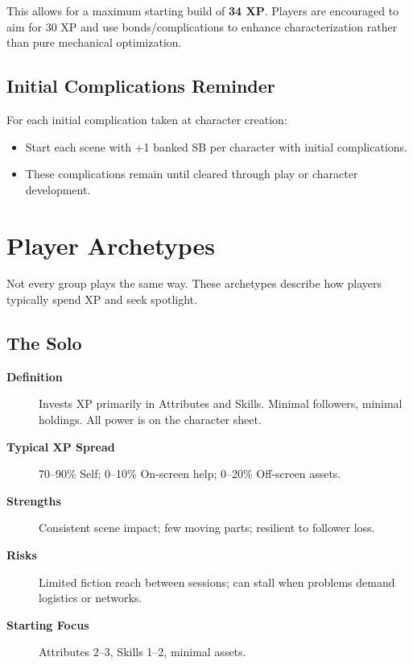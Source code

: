 This allows for a maximum starting build of \textbf{34 XP}. Players are encouraged to aim for 30 XP and use bonds/complications to enhance characterization rather than pure mechanical optimization. 

\subsection{Initial Complications Reminder}
\label{subsec:initial-complications}

For each initial complication taken at character creation:
\begin{itemize}
\item Start each scene with +1 banked SB per character with initial complications.
\item These complications remain until cleared through play or character development.
\end{itemize}

\section{Player Archetypes}
\label{sec:player-archetypes}

Not every group plays the same way. These archetypes describe how players typically spend XP and seek spotlight.

\subsection{The Solo}
\label{subsec:solo-archetype}

\begin{description}
\item[\textbf{Definition}] Invests XP primarily in Attributes and Skills. Minimal followers, minimal holdings. All power is on the character sheet.
\item[\textbf{Typical XP Spread}] 70--90\% Self; 0--10\% On-screen help; 0--20\% Off-screen assets.
\item[\textbf{Strengths}] Consistent scene impact; few moving parts; resilient to follower loss.
\item[\textbf{Risks}] Limited fiction reach between sessions; can stall when problems demand logistics or networks.
\item[\textbf{Starting Focus}] Attributes 2--3, Skills 1--2, minimal assets.
\end{description}

